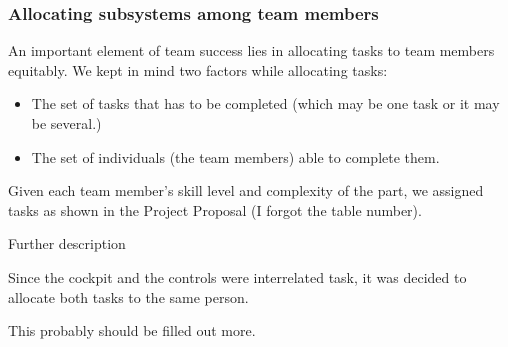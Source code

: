 \subsubsection{Allocating subsystems among team members}

An important element of team success lies in allocating tasks to team members equitably. We kept in mind two factors while allocating tasks:
\begin{itemize}
  \item The set of tasks that has to be completed (which may be one task or it may be several.)
  \item The set of individuals (the team members) able to complete them.
\end{itemize}

Given each team member's skill level and complexity of the part, we assigned tasks as shown in the Project Proposal (I forgot the table number).

Further description

Since the cockpit and the controls were interrelated task, it was decided to allocate both tasks to the same person.

This probably should be filled out more.
